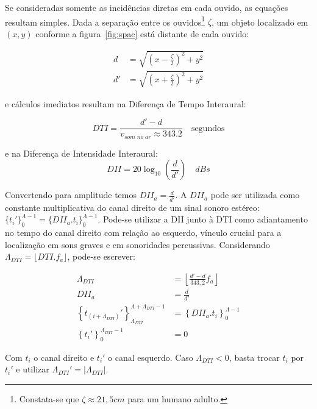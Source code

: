 	Se consideradas somente as incidências diretas em cada ouvido, as equações resultam simples. Dada a separação entre os ouvidos\footnote{Constata-se que $\zeta \approx 21,5cm$ para um humano adulto.} $\zeta$,
um objeto localizado em $(x,y)$ conforme a figura~\ref{fig:spac}
está distante de cada ouvido:

\begin{equation}
\begin{split}
d & =\sqrt{\left (x-\frac{\zeta}{2} \right )^2+y^2} \\
d' & =\sqrt{\left (x+\frac{\zeta}{2} \right )^2 + y^2}
\end{split}
\end{equation}


e cálculos imediatos resultam na Diferença de Tempo Interaural:

\begin{equation}
DTI=\frac{d'-d}{v_{som\;no\;ar}\approx 343.2 }\quad \text{segundos}
\end{equation}

e na Diferença de Intensidade Interaural:
\begin{equation}
DII=20\log_{10}\left (\frac{d}{d'}\right) \quad dBs
\end{equation}

Convertendo para amplitude temos $DII_a=\frac{d}{d'}$. A $DII_a$ pode
ser utilizada como constante multiplicativa do canal direito de um sinal sonoro estéreo: $\{t_i'\}_0^{\Lambda -1}=\{DII_a . t_i\}_0^{\Lambda -1}$. Pode-se utilizar a DII junto à DTI como adiantamento no tempo do canal direito com relação ao esquerdo, vínculo crucial para a localização em sons graves e em sonoridades percussivas.\cite{Heeger}  
Considerando $\Lambda_{DTI}=\lfloor DTI . f_a \rfloor$, pode-se escrever:

\begin{equation}
\begin{split}
\Lambda_{DTI} & = \left \lfloor \frac{d'-d}{343,2}  f_a \right \rfloor \\
DII_a & = \frac{d}{d'} \\
\left\{t_{(i+\Lambda_{DTI})}'\right\}_{\Lambda_{DTI}}^{\Lambda+\Lambda_{DTI}-1} & =\left\{DII_a . t_i\right\}_0^{\Lambda-1} \\
\left\{t_i'\right\}_0^{\Lambda_{DTI}-1} & = 0
\end{split}
\end{equation}

Com $t_i$ o canal direito e $t_i'$ o canal esquerdo. Caso $\Lambda_{DTI} < 0 $, basta trocar $t_i$ por $t_i'$  e utilizar $\Lambda_{DTI}'= | \Lambda_{DTI} | $.

